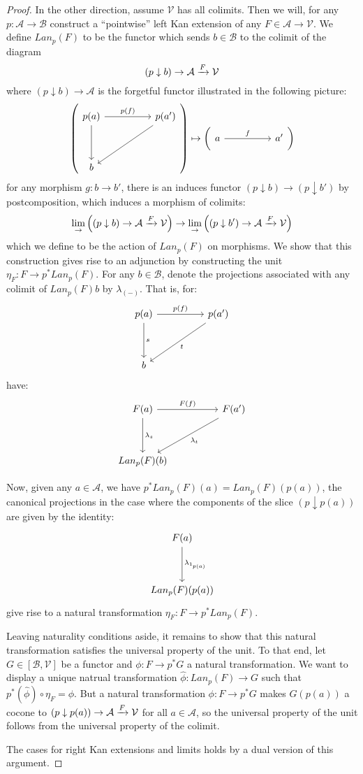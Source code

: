 \begin{thm}
\begin{proof}
      In the other direction, assume $\mathcal{V}$ has all colimits. Then we will, for any $p : \mathcal{A} \to \mathcal{B}$ construct a ``pointwise'' left Kan extension of any $F \in \mathcal{A} \to \mathcal{V}$. We define $Lan_p(F)$ to be the functor which sends $b \in \mathcal{B}$ to the colimit of the diagram
      \[
        (p \downarrow b) \to \mathcal{A} \xrightarrow{F} \mathcal{V}
      \]
      where $(p \downarrow b) \to \mathcal{A}$ is the forgetful functor illustrated in the following picture:
      \[
        \left (
          \ti
        p(a) \ar[d] \ar[r, "p(f)"] & p(a')  \ar[ld] \\
        b
        \kz
      \right ) \mapsto \left(
        \ti a \ar[r, "f"] & a'
        \kz
        \right )
      \]
      for any morphism $g : b \to b'$, there is an induces functor $(p \downarrow b) \to (p \downarrow b')$ by postcomposition, which induces a morphism of colimits:
      \[
        \lim_\to\left ((p \downarrow b) \to \mathcal{A} \xrightarrow{F} \mathcal{V} \right ) \to \lim_\to \left ((p \downarrow b') \to \mathcal{A} \xrightarrow{F} \mathcal{V} \right )
      \]
      which we define to be the action of $Lan_p(F)$ on morphisms. We show that this construction gives rise to an adjunction by constructing the unit $\eta_F : F \to p^*Lan_p(F)$. For any $b \in \mathcal{B}$, denote the projections associated with any colimit of $Lan_p(F)b$ by $\lambda_{(-)}$. That is, for:
      \[
        \ti
        p(a) \ar[d, "s"] \ar[r, "p(f)"] & p(a')  \ar[ld, "t"] \\
        b
        \kz
      \]
      have:
      \[
        \ti
        F(a) \ar[d, "\lambda_s"] \ar[r, "F(f)"] & F(a') \ar[dl, "\lambda_t"] \\
        Lan_p(F)(b)
        \kz
      \]
      
      Now, given any $a \in \mathcal{A}$, we have $p^*Lan_p(F)(a) = Lan_p(F)(p(a))$, the canonical projections in the case where the components of the slice $(p \downarrow p(a))$ are given by the identity:
      \[
        \ti
          F(a) \ar[d, "\lambda_{1_{p(a)}}"]\\
        Lan_p(F)(p(a))
        \kz
      \]
      give rise to a natural transformation $\eta_F : F \to p^*Lan_p(F)$.

      Leaving naturality conditions aside, it remains to show that this natural transformation satisfies the universal property of the unit. To that end, let $G \in [\mathcal{B}, \mathcal{V}]$ be a functor and $\phi : F \to p^*G$ a natural transformation. We want to display a unique natrual transformation $\hat \phi : Lan_p(F) \to G$ such that $p^*(\hat \phi) \circ \eta_F = \phi$. But a natural transformation $\phi : F \to p^*G$ makes $G(p(a))$ a cocone to $(p \downarrow p(a)) \to \mathcal{A} \xrightarrow{F} \mathcal{V}$ for all $a \in \mathcal{A}$, so the universal property of the unit follows from the universal property of the colimit.

      The cases for right Kan extensions and limits holds by a dual version of this argument.
    \end{proof}
  \end{thm}
